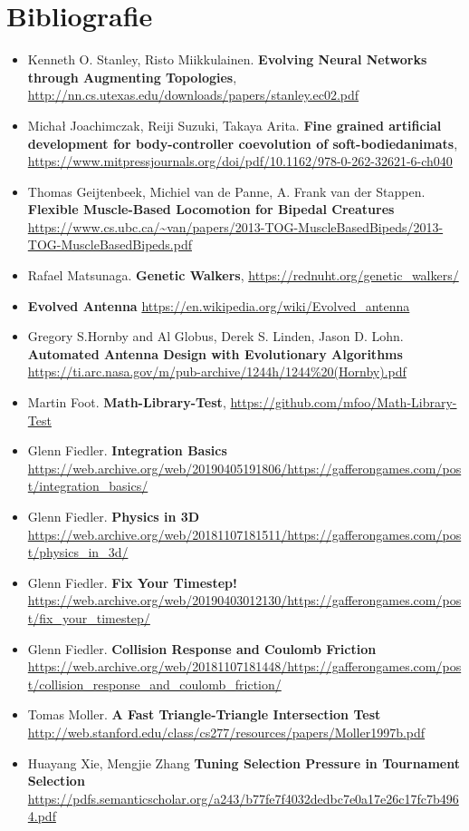 \chapter*{Bibliografie} 

\begin{itemize}
    \item Kenneth O. Stanley, Risto Miikkulainen. \textbf{Evolving Neural Networks through Augmenting Topologies}, \url{http://nn.cs.utexas.edu/downloads/papers/stanley.ec02.pdf}
    \item Michał Joachimczak, Reiji Suzuki,  Takaya Arita. \textbf{Fine grained artificial development for body-controller coevolution of soft-bodiedanimats}, \url{https://www.mitpressjournals.org/doi/pdf/10.1162/978-0-262-32621-6-ch040}
    \item Thomas Geijtenbeek, Michiel van de Panne, A. Frank van der Stappen. \textbf{Flexible Muscle-Based Locomotion for Bipedal Creatures} \url {https://www.cs.ubc.ca/~van/papers/2013-TOG-MuscleBasedBipeds/2013-TOG-MuscleBasedBipeds.pdf}
    \item Rafael Matsunaga. \textbf{Genetic Walkers}, \url{https://rednuht.org/genetic_walkers/}
    \item \textbf{Evolved Antenna} \url{https://en.wikipedia.org/wiki/Evolved_antenna}
    \item Gregory S.Hornby and Al Globus, Derek S. Linden, Jason D. Lohn. \textbf{Automated Antenna Design with Evolutionary Algorithms} \url{https://ti.arc.nasa.gov/m/pub-archive/1244h/1244%20(Hornby).pdf}
    \item Martin Foot. \textbf{Math-Library-Test}, \url{https://github.com/mfoo/Math-Library-Test}
    \item Glenn Fiedler. \textbf{Integration Basics} \url{https://web.archive.org/web/20190405191806/https://gafferongames.com/post/integration_basics/}
    \item Glenn Fiedler. \textbf{Physics in 3D} \url{https://web.archive.org/web/20181107181511/https://gafferongames.com/post/physics_in_3d/}
    \item Glenn Fiedler. \textbf{Fix Your Timestep!} \url{https://web.archive.org/web/20190403012130/https://gafferongames.com/post/fix_your_timestep/}
    \item Glenn Fiedler. \textbf{Collision Response and Coulomb Friction} \url{https://web.archive.org/web/20181107181448/https://gafferongames.com/post/collision_response_and_coulomb_friction/}
    \item Tomas Moller. \textbf{A Fast Triangle-Triangle Intersection Test} \url{http://web.stanford.edu/class/cs277/resources/papers/Moller1997b.pdf}
    \item Huayang Xie, Mengjie Zhang \textbf{Tuning Selection Pressure in Tournament Selection} \url{https://pdfs.semanticscholar.org/a243/b77fe7f4032dedbc7e0a17e26c17fc7b4964.pdf   }
\end{itemize}